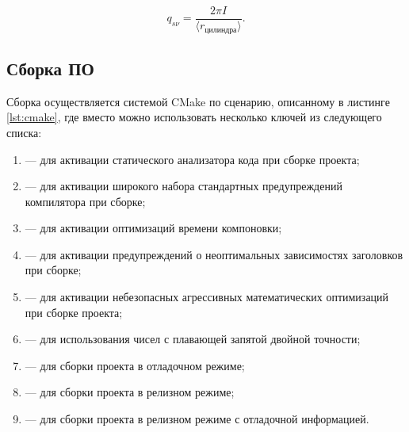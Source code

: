 \begin{equation}
	q_{s\nu} = \frac{2\pi I}{\langle r_{\text{цилиндра}} \rangle}.
\end{equation}




\begin{FixLineStretch}
\section{Сборка ПО}
\end{FixLineStretch}

Сборка осуществляется системой CMake по сценарию, описанному в листинге \ref{lst:cmake}, где вместо \code{[options...]} можно использовать несколько ключей из следующего списка:
\begin{enumerate}
	\item {} — для активации статического анализатора кода при сборке проекта;
	\item {} — для активации широкого набора стандартных предупреждений компилятора при сборке;
	\item {} — для активации оптимизаций времени компоновки;
	\item {} — для активации предупреждений о неоптимальных зависимостях заголовков при сборке;
	\item {} — для активации небезопасных агрессивных математических оптимизаций при сборке проекта;
	\item {} — для использования чисел с плавающей запятой двойной точности;
	\item {} — для сборки проекта в отладочном режиме;
	\item {} — для сборки проекта в релизном режиме;
	\item {} — для сборки проекта в релизном режиме с отладочной информацией.
\end{enumerate}

